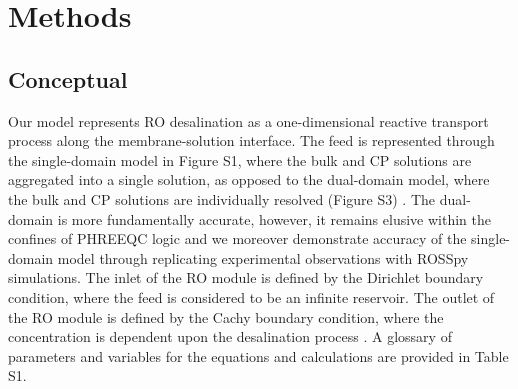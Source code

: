 \section{Methods}

\subsection{Conceptual}

Our model represents RO desalination as a one-dimensional reactive transport process along the membrane-solution interface. The feed is represented through the single-domain model in Figure S1, where the bulk and CP solutions are aggregated into a single solution, as opposed to the dual-domain model, where the bulk and CP solutions are individually resolved (Figure S3) \cite{Chen2016AssessingModel,Scruggs2019TheInterface,Greskowiak2015AUVI,Mieles2012AnalyticalSystem}. The dual-domain is more fundamentally accurate, however, it remains elusive within the confines of PHREEQC logic and we moreover demonstrate accuracy of the single-domain model through replicating experimental observations with ROSSpy simulations. The inlet of the RO module is defined by the Dirichlet boundary condition, where the feed is considered to be an infinite reservoir. The outlet of the RO module is defined by the Cachy boundary condition, where the concentration is dependent upon the desalination process \cite{Gosses2018ExplicitModels,Moes2006ImposingMethod,Bazilevs2007WeakMechanics}. A glossary of parameters and variables for the equations and calculations are provided in Table S1.

